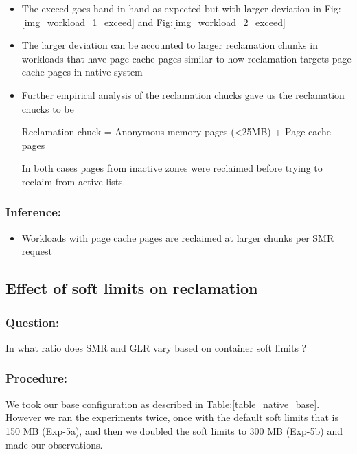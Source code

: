 	\begin{itemize}
	  \item The exceed goes hand in hand as expected but with larger deviation in Fig:\ref{img_workload_1_exceed} and 
Fig:\ref{img_workload_2_exceed}
	  \item The larger deviation can be accounted to larger reclamation chunks in workloads that have page cache pages similar to how 
reclamation targets page cache pages in native system
	  \item Further empirical analysis of the reclamation chucks gave us the reclamation chucks to be 
	      \begin{center}
		  Reclamation chuck = Anonymous memory pages (\textless 25MB) + Page cache pages
	      \end{center}
	      In both cases pages from inactive zones were reclaimed before trying to reclaim from active lists.
	\end{itemize}

	\subsubsection{Inference:}
	
	\begin{itemize}
	  \item Workloads with page cache pages are reclaimed at larger chunks per SMR request
	\end{itemize}
      
      \subsection{Effect of soft limits on reclamation}
	
	\subsubsection{Question:} 
	  In what ratio does SMR and GLR vary based on container soft limits ?
	
	\subsubsection{Procedure:}
	  We took our base configuration as described in Table:\ref{table_native_base}. However we ran the experiments twice, 
once with the default soft limits that is 150 MB (Exp-5a), and then we doubled the soft limits to 300 MB (Exp-5b) and made our observations.
	
